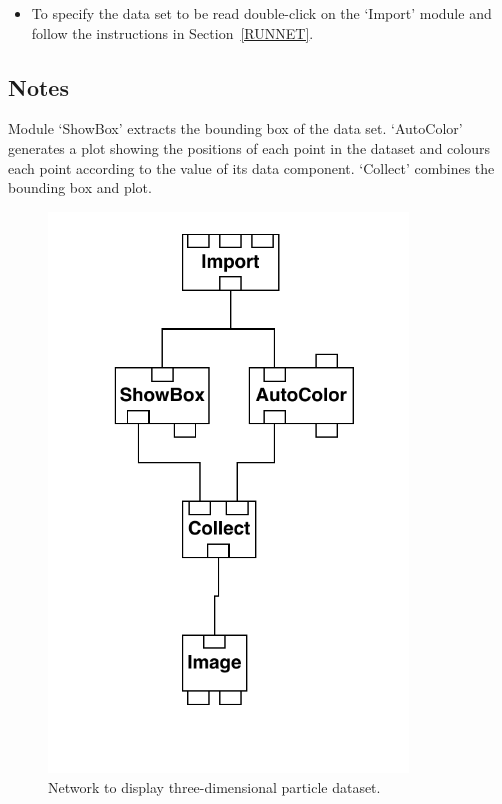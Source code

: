 \documentclass[twoside,11pt]{starlink}
\begin{document}
\begin{itemize}

  \item To specify the data set to be read double-click on the `Import'
   module and follow the instructions in Section~\ref{RUNNET}.

\end{itemize}

\subsection{Notes}

Module `ShowBox' extracts the bounding box of the data set. `AutoColor'
generates a plot showing the positions of each point in the dataset and
colours each point according to the value of its data component.
`Collect' combines the bounding box and plot.

\begin{figure}[htbp]

\begin{center}
\leavevmode
\includegraphics[width=271pt]{sc2_particle}
\end{center}

\caption[Network to display three-dimensional particle dataset.]{Network
to display three-dimensional particle dataset. \label{PARTNETF} }

\end{figure}
\end{document}

